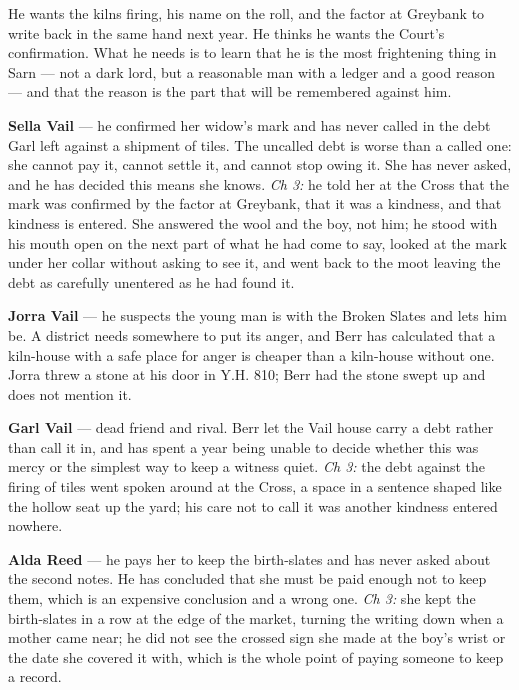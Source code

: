 \documentclass{design/chronicle}
\begin{document}
{
He wants the kilns firing, his name on the roll, and the factor at Greybank to write back in the same hand next year. He thinks he wants the Court’s confirmation. What he needs is to learn that he is the most frightening thing in Sarn — not a dark lord, but a reasonable man with a ledger and a good reason — and that the reason is the part that will be remembered against him.

\textbf{Sella Vail} — he confirmed her widow’s mark and has never called in the debt Garl left against a shipment of tiles. The uncalled debt is worse than a called one: she cannot pay it, cannot settle it, and cannot stop owing it. She has never asked, and he has decided this means she knows. \emph{Ch 3:} he told her at the Cross that the mark was confirmed by the factor at Greybank, that it was a kindness, and that kindness is entered. She answered the wool and the boy, not him; he stood with his mouth open on the next part of what he had come to say, looked at the mark under her collar without asking to see it, and went back to the moot leaving the debt as carefully unentered as he had found it.

\textbf{Jorra Vail} — he suspects the young man is with the Broken Slates and lets him be. A district needs somewhere to put its anger, and Berr has calculated that a kiln-house with a safe place for anger is cheaper than a kiln-house without one. Jorra threw a stone at his door in Y.H. 810; Berr had the stone swept up and does not mention it.

\textbf{Garl Vail} — dead friend and rival. Berr let the Vail house carry a debt rather than call it in, and has spent a year being unable to decide whether this was mercy or the simplest way to keep a witness quiet. \emph{Ch 3:} the debt against the firing of tiles went spoken around at the Cross, a space in a sentence shaped like the hollow seat up the yard; his care not to call it was another kindness entered nowhere.

\textbf{Alda Reed} — he pays her to keep the birth-slates and has never asked about the second notes. He has concluded that she must be paid enough not to keep them, which is an expensive conclusion and a wrong one. \emph{Ch 3:} she kept the birth-slates in a row at the edge of the market, turning the writing down when a mother came near; he did not see the crossed sign she made at the boy’s wrist or the date she covered it with, which is the whole point of paying someone to keep a record.

}
\end{document}
